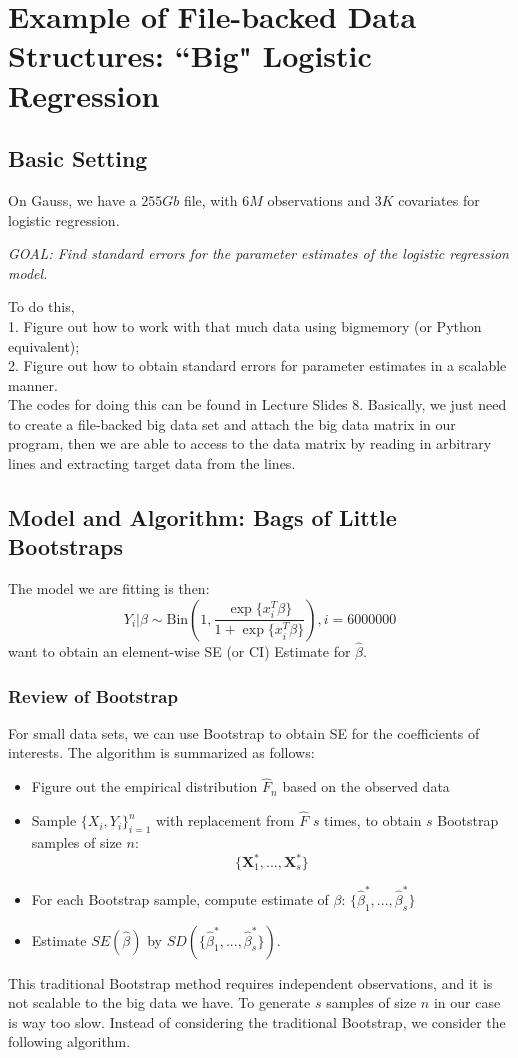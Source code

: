 \documentclass[article]{memoir}
\DeclareMathOperator{\1}{\mathbf{1}}
\theoremstyle{definition}
\begin{document}
\chapter{Example of File-backed Data Structures: ``Big" Logistic Regression}
\section{Basic Setting}
On Gauss, we have a $255Gb$ file, with $6M$ observations and $3K$ covariates for logistic regression.
\begin{center}
\emph{GOAL: Find standard errors for the parameter estimates of the logistic regression model.}\\
\end{center}
To do this, \\
1. Figure out how to work with that much data using bigmemory (or Python equivalent);\\
2. Figure out how to obtain standard errors for parameter estimates in a scalable manner.\\

The codes for doing this can be found in Lecture Slides 8. Basically, we just need to create a file-backed big data set and attach the big data matrix in our program, then we are able to access to the data matrix by reading in arbitrary lines and extracting target data from the lines.\\

\section{Model and Algorithm: Bags of Little Bootstraps}
The model we are fitting is then:
$$Y_i|\beta \sim \text{Bin}\left( 1,\frac{\exp\{x_i^T\beta\}}{1+\exp\{x_i^T\beta\}}\right),i=6000000$$
want to obtain an element-wise SE (or CI) Estimate for $\widehat{\beta}$.

\subsection{Review of Bootstrap}
For small data sets, we can use Bootstrap to obtain SE for the coefficients of interests. The algorithm is summarized as follows:
\begin{itemize}
\item Figure out the empirical distribution $\widehat{F}_n$ based on the observed data
\item Sample $\{X_i,Y_i\}_{i=1}^n$ with replacement from $\widehat{F}$ $s$ times, to obtain $s$ Bootstrap samples of size $n$:
    $$\{\mathbf{X}_1^*,...,\mathbf{X}_s^*\}$$
\item For each Bootstrap sample, compute estimate of $\beta$: $\{\widehat{\beta}_1^*,...,\widehat{\beta}_s^*\}$
\item Estimate $SE(\widehat{\beta})$ by $SD(\{\widehat{\beta}_1^*,...,\widehat{\beta}_s^*\})$.
\end{itemize}
This traditional Bootstrap method requires independent observations, and it is not scalable to the big data we have. To generate $s$ samples of size $n$ in our case is way too slow. Instead of considering the traditional Bootstrap, we consider the following algorithm.
\end{document}
